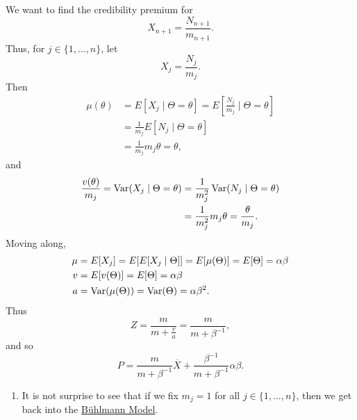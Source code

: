 \documentclass[notoc,notitlepage]{tufte-book}
\begin{document}
\begin{solution}
  We want to find the credibility premium for
  \begin{equation*}
    X_{n+1} = \frac{N_{n+1}}{m_{n+1}}.
  \end{equation*}
  Thus, for $j \in \{ 1, \ldots, n \}$, let
  \begin{equation*}
    X_j = \frac{N_j}{m_j}.
  \end{equation*}
  Then
  \begin{align*}
    \mu(\theta) &= E[X_j \mid \Theta = \theta]
                 = E \left[ \frac{N_j}{m_j} \mid \Theta = \theta \right] \\
                &= \frac{1}{m_j} E [ N_j \mid \Theta = \theta ] \\
                &= \frac{1}{m_j} m_j \theta = \theta,
  \end{align*}
  and
  \begin{align*}
    \frac{v(\theta)}{m_j} = \operatorname{Var}(X_j \mid \Theta = \theta)
    &= \frac{1}{m_j^2} \operatorname{Var}(N_j \mid \Theta = \theta) \\
    &= \frac{1}{m_j^2} m_j \theta = \frac{\theta}{m_j}.
  \end{align*}
  Moving along,
  \begin{align*}
    \mu &= E[X_j] = E[E[X_j \mid \Theta]] = E[\mu(\Theta)]
      = E[\Theta] = \alpha\beta \\
    v &= E[v(\Theta)] = E[\Theta] = \alpha\beta \\
    a &= \operatorname{Var}(\mu(\Theta)) = \operatorname{Var}(\Theta) = \alpha\beta^2.
  \end{align*}
  Thus
  \begin{equation*}
    Z = \frac{m}{m + \frac{v}{a}} = \frac{m}{m + \beta^{-1}},
  \end{equation*}
  and so
  \begin{equation*}
    P = \frac{m}{m + \beta^{-1}} \overline{X} + \frac{\beta^{-1}}{m +
    \beta^{-1}} \alpha\beta.
  \end{equation*}
\end{solution}

\begin{note}
  \begin{enumerate}
    \item It is not surprise to see that if we fix $m_j = 1$
      for all $j \in \{1, \ldots, n\}$, then we get back into the
      \hyperref[thm:buhlmann_credibility_premium]{B\"{u}hlmann Model}.
  \end{enumerate}
\end{note}
\end{document}
